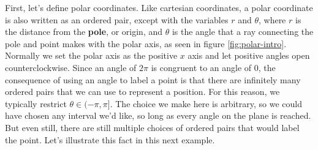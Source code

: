 \documentclass[11pt]{article}
\numberwithin{lemma}{section}
\numberwithin{equation}{section}
\numberwithin{define}{section}
\numberwithin{prop}{section}
\numberwithin{figure}{section}
\numberwithin{theorem}{section}
\numberwithin{cor}{section}
\newcounter{ex}[section]
\numberwithin{ex}{section}
\begin{document}
First, let's define polar coordinates. Like cartesian coordinates, a polar coordinate is also written as an ordered pair, except with the variables $r$ and $\theta$, where $r$ is the distance from the \textbf{pole}, or origin, and $\theta$ is the angle that a ray connecting the pole and point makes with the polar axis, as seen in figure \eqref{fig:polar-intro}.
Normally we set the polar axis as the positive $x$ axis and let positive angles open counterclockwise.
Since an angle of $2\pi$ is congruent to an angle of $0$, the consequence of using an angle to label a point is that there are infinitely many ordered pairs that we can use to represent a position. 
For this reason, we typically restrict $\theta\in(-\pi,\pi]$. The choice we make here is arbitrary, so we could have chosen any interval we'd like, so long as every angle on the plane is reached.
But even still, there are still multiple choices of ordered pairs that would label the point.
Let's illustrate this fact in this next example.
\end{document}
